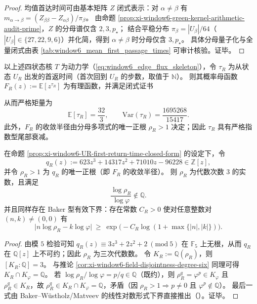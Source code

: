 \begin{proof}
均值首达时间可由基本矩阵 \(Z\) 闭式表示：对 \(\alpha\neq\beta\) 有
\(
m_{\alpha\to\beta}=(Z_{\beta\beta}-Z_{\alpha\beta})/\pi_\beta
\)。
由命题 \ref{prop:xi-window6-green-kernel-arithmetic-audit-prime}，\(Z\) 的分母谱仅含 \(2,3,p_\star\)；
结合平稳分布 \(\pi_\beta=|U_\beta|/64\)（\(|U_\beta|\in\{27,22,9,6\}\)）并化简，得到 \(\alpha\neq\beta\) 时分母仅含 \(3,p_\star\)。
具体分母量子化与全量闭式由表 \ref{tab:window6_mean_first_passage_times} 可审计核验。证毕。
\end{proof}





\begin{proposition}\label{prop:xi-window6-UR-first-return-time-closed-form}
以上述四状态核 \(T\) 为动力学（\eqref{eq:window6_edge_flux_skeleton}），令 \(\tau_R\) 为从状态 \(U_R\) 出发的首返时间（首次回到 \(U_R\) 的步数，取值于 \(\mathbb N\)）。
则其概率母函数 \(F_R(z):=\mathbb E[z^{\tau_R}]\) 为有理函数，并满足闭式证书

从而严格矩量为
\[
\mathbb E[\tau_R]=\frac{32}{3},
\qquad
\mathrm{Var}(\tau_R)=\frac{1695268}{15417}.
\]
此外，\(F_R\) 的收敛半径由分母多项式的唯一正根 \(\rho_R>1\) 决定；因此 \(\tau_R\) 具有严格指数型尾部衰减。
\end{proposition}

\begin{corollary}\label{cor:xi-window6-logrhoR-logphi-irrational}
在命题 \ref{prop:xi-window6-UR-first-return-time-closed-form} 的设定下，令
\[
q_R(z):=623z^3+14317z^2+71010z-96228\in\mathbb Z[z],
\]
并令 \(\rho_R>1\) 为 \(q_R\) 的唯一正根（即 \(F_R\) 的收敛半径）。
则 \(\rho_R\) 为代数次数 \(3\) 的实数，且满足
\[
\frac{\log\rho_R}{\log\varphi}\notin\mathbb Q.
\]
并且同样存在 Baker 型有效下界：存在常数 \(C_R>0\) 使对任意整数对 \((n,k)\neq(0,0)\) 有
\[
\bigl|n\log\rho_R-k\log\varphi\bigr|
\ \ge\
\exp\!\bigl(-C_R\log(1+\max\{|n|,|k|\})\bigr).
\]
\end{corollary}

\begin{proof}
由模 \(5\) 检验可知 \(q_R(z)\equiv 3z^3+2z^2+2\ (\mathrm{mod}\ 5)\) 在 \(\mathbb F_5\) 上无根，从而 \(q_R\) 在 \(\mathbb Q[z]\) 上不可约；因此 \(\rho_R\) 为三次代数数。
令 \(K_R:=\mathbb Q(\rho_R)\)，则 \([K_R:\mathbb Q]=3\)。
与推论 \ref{cor:xi-window6-field-disjointness-degree-six} 同理可得 \(K_R\cap K_\varphi=\mathbb Q\)。
若 \(\log\rho_R/\log\varphi=p/q\in\mathbb Q\)（既约），则 \(\rho_R^q=\varphi^{p}\in K_\varphi\) 且 \(\rho_R^q\in K_R\)，故 \(\rho_R^q\in K_R\cap K_\varphi=\mathbb Q\)，矛盾（因 \(\rho_R>1\Rightarrow p\neq 0\) 且 \(\varphi^{p}\notin\mathbb Q\)）。
最后一式由 Baker--W\"ustholz/Matveev 的线性对数形式下界直接推出（\cite{BakerWustholz2007LogarithmicForms,Matveev2000LinearFormsLogs}）。证毕。
\end{proof}

